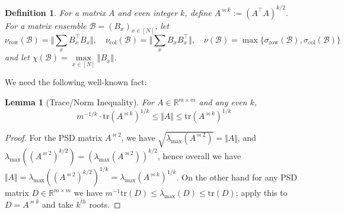 \documentclass[11pt]{article}
\newtheorem{lemma}{Lemma}
\newtheorem{definition}{Definition}
\newcommand{\norm}[1]{\Vert #1 \Vert}
\newcommand{\N}{[N]}
\begin{document}
\begin{definition}
For a matrix $A$ and even integer $k$, define $A^{\bowtie k}:= (A^\top A)^{k/2}$. For a matrix ensemble $\mathcal{B} = (B_x)_{x \in 
\N}$, let
\[
\nu_{\mathrm{row}}(\mathcal{B}) = \norm{ \sum_x B_x^\top B_x}, \quad \nu_{\mathrm{col}}(\mathcal{B}) = \norm{ \sum_x  B_x B_x^\top }, \quad 
\nu(\mathcal{B}) = \max\{\sigma_\mathrm{row}(\mathcal{B}), \sigma_\mathrm{col}(\mathcal{B})\}
\]
and let $\chi(\mathcal{B}) = \max\limits_{x \in \N} \norm{B_x}$.
\end{definition}
We need the following well-known fact:
\begin{lemma}[Trace/Norm Inequality]\label{lem:trace-norm}
For $A \in \mathbb{R}^{m \times m}$ and any even $k$, 
\[
m^{-1/k}\cdot \mathrm{tr}(A^{\bowtie k})^{1/k} \leq \norm{A} \leq \mathrm{tr}(A^{\bowtie k})^{1/k}\]
\end{lemma}
\begin{proof}
For the PSD matrix $A^{\bowtie 2}$, we have $\sqrt{\lambda_{\max}(A^{\bowtie 2})} = \norm{A}$, and $\lambda_{\max}((A^{\bowtie 2})^{k/2}) = (\lambda_{\max}(A^{\bowtie 2}))^{k/2}$, hence overall we have $\norm{A} = \lambda_{\max}((A^{\bowtie 2})^{k/2})^{1/k} = \lambda_{\max}(A^{\bowtie k})^{1/k}$. On the other hand for any PSD matrix $D \in \mathbb{R}^{m \times m}$ we have $m^{-1}\mathrm{tr}(D) \leq \lambda_{\max}(D) \leq  \mathrm{tr}(D)$; apply this to $D = A^{\bowtie k}$ and take $k^{th}$ roots.
\end{proof}
\end{document}

